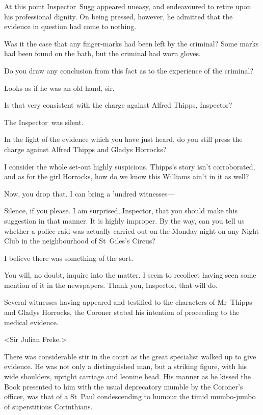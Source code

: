 At this point Inspector~Sugg appeared uneasy, and endeavoured to retire upon his professional dignity. On being pressed, however, he admitted that the evidence in question had come to nothing.

\begin{dialogue}
 Was it the case that any finger-marks had been left by the criminal?
Some marks had been found on the bath, but the criminal had worn gloves.

 Do you draw any conclusion from this fact as to the experience of the criminal?

 Looks as if he was an old hand, sir.

 Is that very consistent with the charge against Alfred Thipps, Inspector?

The Inspector~was silent.

 In the light of the evidence which you have just heard, do you still press the charge against Alfred Thipps and Gladys Horrocks?

 I consider the whole set-out highly suspicious. Thipps's story isn't corroborated, and as for the girl Horrocks, how do we know this Williams ain't in it as well?

 Now, you drop that. I can bring a 'undred witnesses—

 Silence, if you please. I am surprised, Inspector, that you should make this suggestion in that manner. It is highly improper. By the way, can you tell us whether a police raid was actually carried out on the Monday night on any Night Club in the neighbourhood of St~Giles's Circus?

  I believe there was something of the sort.

 You will, no doubt, inquire into the matter. I seem to recollect having seen some mention of it in the newspapers. Thank you, Inspector, that will do.
\end{dialogue}

Several witnesses having appeared and testified to the characters of Mr~Thipps and Gladys Horrocks, the Coroner stated his intention of proceeding to the medical evidence.

<Sir Julian Freke.>

There was considerable stir in the court as the great specialist walked up to give evidence. He was not only a distinguished man, but a striking figure, with his wide shoulders, upright carriage and leonine head. His manner as he kissed the Book presented to him with the usual deprecatory mumble by the Coroner's officer, was that of a St~Paul condescending to humour the timid mumbo-jumbo of superstitious Corinthians.


